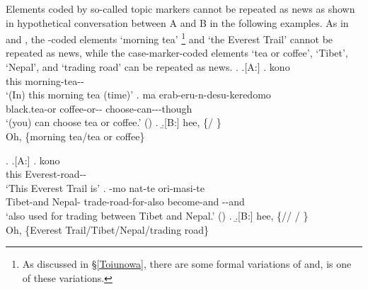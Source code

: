 Elements coded by so-called topic markers cannot be repeated as news as shown in hypothetical conversation between A and B in the following examples.
%
%		
As in \Next and \NNext,
the -coded elements
 `morning tea'%
	\footnote{
	As discussed in \S \ref{Toiunowa},
	there are some formal variations of  and,
	 is one of these variations.
	}
and  `the Everest Trail'
cannot be repeated as news,
while the case-marker-coded elements  `tea or coffee',  `Tibet',  `Nepal', and  `trading road'
can be repeated as news.
%
	\ex. \a.[A:] \ag. kono  \\
			this morning-tea-- \\
			`(In) this morning tea (time)'
		\bg. ma   erab-eru-n-desu-keredomo \\
			 black.tea-or coffee-or-- choose-can---though \\
			`(you) can choose tea or coffee.'
			 \hfill{()}
		\z.	
	\b.[B:] hee, \{/ \}\\
			Oh, \{morning tea/tea or coffee\}
	

%
	\ex. \a.[A:] \ag. kono  \\
			this Everest-road-- \\
			`This Everest Trail is'
		\bg.   -mo nat-te ori-masi-te \\
			Tibet-and Nepal- trade-road-for-also  become-and \ab{plt}--and \\
			`also used for trading between Tibet and Nepal.'
			 \hfill{()}
		\z.
	\b.[B:] hee, \{// / \}\\
			Oh, \{Everest Trail/Tibet/Nepal/trading road\}
	

